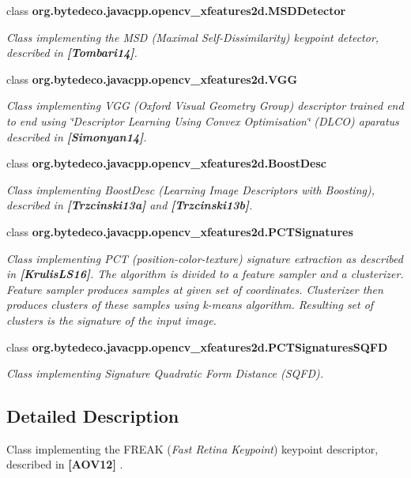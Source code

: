 \begin{DoxyCompactItemize}
class {\bfseries org.\+bytedeco.\+javacpp.\+opencv\+\_\+xfeatures2d.\+M\+S\+D\+Detector}
\begin{DoxyCompactList}\small\item\em Class implementing the M\+SD ({\itshape Maximal Self-\/\+Dissimilarity}) keypoint detector, described in {\bfseries [Tombari14]}. \end{DoxyCompactList}\item 
class {\bfseries org.\+bytedeco.\+javacpp.\+opencv\+\_\+xfeatures2d.\+V\+GG}
\begin{DoxyCompactList}\small\item\em Class implementing V\+GG (Oxford Visual Geometry Group) descriptor trained end to end using \char`\"{}\+Descriptor Learning Using Convex Optimisation\char`\"{} (D\+L\+CO) aparatus described in {\bfseries [Simonyan14]}. \end{DoxyCompactList}\item 
class {\bfseries org.\+bytedeco.\+javacpp.\+opencv\+\_\+xfeatures2d.\+Boost\+Desc}
\begin{DoxyCompactList}\small\item\em Class implementing Boost\+Desc (Learning Image Descriptors with Boosting), described in {\bfseries [Trzcinski13a]} and {\bfseries [Trzcinski13b]}. \end{DoxyCompactList}\item 
class {\bfseries org.\+bytedeco.\+javacpp.\+opencv\+\_\+xfeatures2d.\+P\+C\+T\+Signatures}
\begin{DoxyCompactList}\small\item\em Class implementing P\+CT (position-\/color-\/texture) signature extraction as described in {\bfseries [Krulis\+L\+S16]}. The algorithm is divided to a feature sampler and a clusterizer. Feature sampler produces samples at given set of coordinates. Clusterizer then produces clusters of these samples using k-\/means algorithm. Resulting set of clusters is the signature of the input image. \end{DoxyCompactList}\item 
class {\bfseries org.\+bytedeco.\+javacpp.\+opencv\+\_\+xfeatures2d.\+P\+C\+T\+Signatures\+S\+Q\+FD}
\begin{DoxyCompactList}\small\item\em Class implementing Signature Quadratic Form Distance (S\+Q\+FD). \end{DoxyCompactList}\end{DoxyCompactItemize}


\subsection{Detailed Description}
Class implementing the F\+R\+E\+AK ({\itshape Fast Retina Keypoint}) keypoint descriptor, described in {\bfseries [A\+O\+V12]} . 

